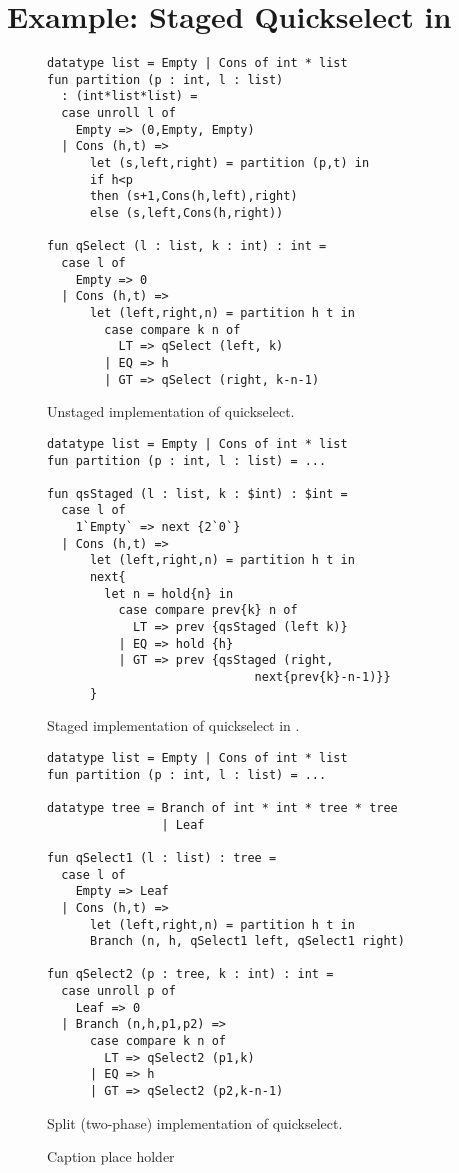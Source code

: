 \section {Example: Staged Quickselect in \texorpdfstring{\lang}{λ12}}
\label{sec:staging}

\begin{figure*}
\label{fig:quickselect}
\begin{minipage}{0.5\textwidth}
\begin{lstlisting} 
datatype list = Empty | Cons of int * list
fun partition (p : int, l : list) 
  : (int*list*list) =
  case unroll l of 
    Empty => (0,Empty, Empty) 
  | Cons (h,t) =>
      let (s,left,right) = partition (p,t) in
      if h<p 
      then (s+1,Cons(h,left),right)
      else (s,left,Cons(h,right))

fun qSelect (l : list, k : int) : int = 
  case l of
    Empty => 0
  | Cons (h,t) => 
      let (left,right,n) = partition h t in
        case compare k n of
          LT => qSelect (left, k)
        | EQ => h
        | GT => qSelect (right, k-n-1)
\end{lstlisting}
\caption{Unstaged implementation of quickselect.}
\end{minipage}
\begin{minipage}{0.5\textwidth}
\begin{lstlisting} 
datatype list = Empty | Cons of int * list
fun partition (p : int, l : list) = ...

fun qsStaged (l : list, k : $int) : $int = 
  case l of
    1`Empty` => next {2`0`}
  | Cons (h,t) => 
      let (left,right,n) = partition h t in
      next{
        let n = hold{n} in
          case compare prev{k} n of
            LT => prev {qsStaged (left k)}
          | EQ => hold {h}
          | GT => prev {qsStaged (right, 
                             next{prev{k}-n-1)}}
      }	
\end{lstlisting}
\caption{Staged implementation of quickselect in \lang.}
\end{minipage}
\begin{minipage}{0.5\textwidth}
\begin{lstlisting}
datatype list = Empty | Cons of int * list
fun partition (p : int, l : list) = ...
	
datatype tree = Branch of int * int * tree * tree
                | Leaf

fun qSelect1 (l : list) : tree =
  case l of
    Empty => Leaf
  | Cons (h,t) => 
      let (left,right,n) = partition h t in
      Branch (n, h, qSelect1 left, qSelect1 right)

fun qSelect2 (p : tree, k : int) : int = 
  case unroll p of
    Leaf => 0
  | Branch (n,h,p1,p2) => 
      case compare k n of
        LT => qSelect2 (p1,k)
      | EQ => h
      | GT => qSelect2 (p2,k-n-1)
\end{lstlisting}
\caption{Split (two-phase) implementation of quickselect.}
\end{minipage}
\caption{Caption place holder}
\end{figure*}

